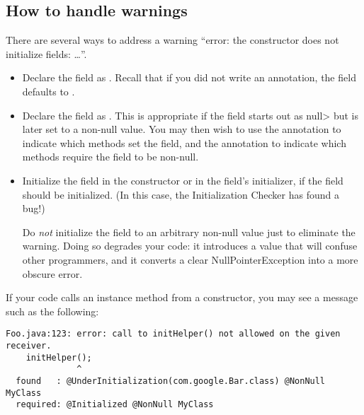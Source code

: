 


\subsection{How to handle warnings\label{initialization-warnings}}

There are several ways to address a warning ``error:  the constructor does
not initialize fields: \ldots''.
\begin{itemize}
\item
  Declare the field as .  Recall
  that if you did not write an annotation, the field defaults to
  .
\item
  Declare the field as .
  This is appropriate if the field starts out as \<null> but is later set
  to a non-null value.  You may then wish to use the
   annotation to indicate
  which methods set the field, and the
   annotation to indicate
  which methods require the field to be non-null.
\item
  Initialize the field in the constructor or in the field's initializer, if
  the field should be initialized.  (In this case, the Initialization
  Checker has found a bug!)

  Do \emph{not} initialize the field to an arbitrary non-null value just to
  eliminate the warning.  Doing so degrades your code:  it introduces a
  value that will confuse other programmers, and it converts a clear
  NullPointerException into a more obscure error.
\end{itemize}

If your code calls an instance method from a constructor, you may see a
message such as the following:

\begin{Verbatim}
Foo.java:123: error: call to initHelper() not allowed on the given receiver.
    initHelper();
              ^
  found   : @UnderInitialization(com.google.Bar.class) @NonNull MyClass
  required: @Initialized @NonNull MyClass
\end{Verbatim}

